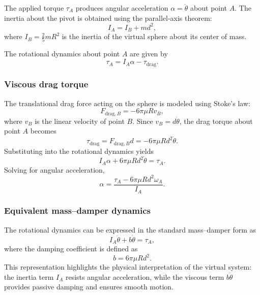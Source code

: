 \documentclass[journal]{IEEEtran}
\begin{document}
The applied torque $\tau_A$ produces angular acceleration $\alpha = \ddot{\theta}$ about point $A$. The inertia about the pivot is obtained using the parallel-axis theorem:
%
\begin{equation}
I_A = I_B + md^2,
\end{equation}
%
where $I_B = \frac{2}{5} m R^2$ is the inertia of the virtual sphere about its center of mass.

The rotational dynamics about point $A$ are given by
%
\begin{equation}
\tau_A = I_A \alpha - \tau_{\mathrm{drag}}.
\end{equation}
%
\subsubsection{Viscous drag torque}

The translational drag force acting on the sphere is modeled using Stoke's law:
%
\begin{equation}
F_{\mathrm{drag},B} = -6\pi \mu R v_B,
\end{equation}
%
where $v_B$ is the linear velocity of point $B$. Since $v_B = d\dot{\theta}$, the drag torque about point $A$ becomes
%
\begin{equation}
\tau_{\mathrm{drag}} = F_{\mathrm{drag},B} d = -6\pi \mu R d^2 \dot{\theta}.
\end{equation}
%
Substituting into the rotational dynamics yields
%
\begin{equation}
I_A \alpha + 6\pi \mu R d^2 \dot{\theta} = \tau_A.
\end{equation}
%
Solving for angular acceleration,
%
\begin{equation}
\alpha = \frac{\tau_A - 6\pi \mu R d^2 \omega_A}{I_A}.
\end{equation}
%
\subsubsection{Equivalent mass--damper dynamics}

The rotational dynamics can be expressed in the standard mass--damper form as
%
\begin{equation}
I_A \ddot{\theta} + b \dot{\theta} = \tau_A,
\label{eq:rot_dyn_compact}
\end{equation}
%
where the damping coefficient is defined as
%
\begin{equation}
b = 6\pi \mu R d^2.
\end{equation}
%
This representation highlights the physical interpretation of the virtual system: the inertia term $I_A$ resists angular acceleration, while the viscous term $b \dot{\theta}$ provides passive damping and ensures smooth motion.
\end{document}
